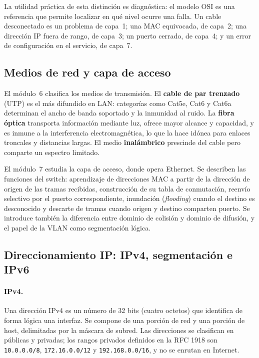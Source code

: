 \documentclass[11pt,a4paper]{article}
\begin{document}
La utilidad práctica de esta distinción es diagnóstica: el modelo OSI es una
referencia que permite localizar en qué nivel ocurre una falla. Un cable
desconectado es un problema de capa~1; una MAC equivocada, de capa~2; una
dirección IP fuera de rango, de capa~3; un puerto cerrado, de capa~4; y un
error de configuración en el servicio, de capa~7.

\subsection{Medios de red y capa de acceso}

El módulo~6 clasifica los medios de transmisión. El \textbf{cable de par
trenzado} (UTP) es el más difundido en LAN: categorías como Cat5e, Cat6 y Cat6a
determinan el ancho de banda soportado y la inmunidad al ruido. La
\textbf{fibra óptica} transporta información mediante luz, ofrece mayor
alcance y capacidad, y es inmune a la interferencia electromagnética, lo que
la hace idónea para enlaces troncales y distancias largas. El medio
\textbf{inalámbrico} prescinde del cable pero comparte un espectro limitado.

El módulo~7 estudia la capa de acceso, donde opera Ethernet. Se describen las
funciones del switch: aprendizaje de direcciones MAC a partir de la dirección
de origen de las tramas recibidas, construcción de su tabla de conmutación,
reenvío selectivo por el puerto correspondiente, inundación
(\textit{flooding}) cuando el destino es desconocido y descarte de tramas
cuando origen y destino comparten puerto. Se introduce también la diferencia
entre dominio de colisión y dominio de difusión, y el papel de la VLAN como
segmentación lógica.

\subsection{Direccionamiento IP: IPv4, segmentación e IPv6}

\paragraph{IPv4.} Una dirección IPv4 es un número de 32 bits (cuatro octetos)
que identifica de forma lógica una interfaz. Se compone de una porción de red y
una porción de host, delimitadas por la máscara de subred. Las direcciones se
clasifican en públicas y privadas; los rangos privados definidos en la RFC 1918
son \texttt{10.0.0.0/8}, \texttt{172.16.0.0/12} y \texttt{192.168.0.0/16}, y no
se enrutan en Internet.
\end{document}
